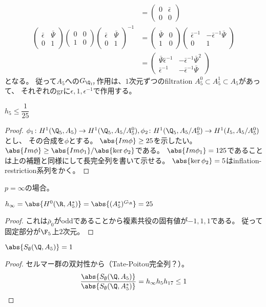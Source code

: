 \documentclass{jsarticle}
\begin{document}
\begin{align*}
&=\begin{pmatrix}0&\bar{\epsilon}\\0&0\end{pmatrix}\\
\begin{pmatrix}\bar{\epsilon}&\bar{\Psi}\\0&1\end{pmatrix}\begin{pmatrix}0&0\\1&0\end{pmatrix}\begin{pmatrix}\bar{\epsilon}&\bar{\Psi}\\0&1\end{pmatrix}^{-1}
&=\begin{pmatrix}\bar{\Psi}&0\\1&0\end{pmatrix}\begin{pmatrix}\bar{\epsilon}^{-1}&-\bar{\epsilon}^{-1}\bar{\Psi}\\0&1\end{pmatrix}\\
&=\begin{pmatrix}\bar{\Psi}\bar{\epsilon}^{-1}&-\bar{\epsilon}^{-1}\bar{\Psi}^2\\\bar{\epsilon}^{-1}&-\bar{\epsilon}^{-1}\bar{\Psi}\end{pmatrix}
\end{align*}
となる。
従って$A_5$への$G_{\Q_{17}}$作用は、$1$次元ずつのfiltration $A^0_5\subset A^1_5\subset A_5$があって、
それぞれのgrに$\epsilon, 1, \epsilon^{-1}$で作用する。
\begin{prop}
$h_{5}\leq\dfrac{1}{25}$
\end{prop}
\begin{proof}
$\phi_1\colon H^1(\Q_5,A_5)\to H^1(\Q_5,A_5/A_5^0), \phi_2\colon H^1(\Q_5,A_5/A_5^0)\to H^1(I_5,A_5/A_5^0)$とし、
その合成を$\phi$とする。
$\abs{Im\phi}\geq25$を示したい。
$\abs{Im\phi}\geq\abs{Im\phi_1}/\abs{\ker\phi_2}$である。
$\abs{Im\phi_1}=125$であることは上の補題と同様にして長完全列を書いて示せる。
$\abs{\ker\phi_2}=5$はinflation-restriction系列をかく。
\end{proof}

$p=\infty$の場合。
\begin{lem}
$h_\infty=\abs{H^0(\R,A_5^*)}=\abs{(A_5^*)^{G_\R}}=25$
\end{lem}
\begin{proof}
これは$\bar{\rho}_0$がoddであることから複素共役の固有値が$-1, 1, 1$である。
従って固定部分が$\F_5$上$2$次元。
\end{proof}
\begin{prop}
$\abs{S_\emptyset(\Q,A_5)}=1$
\end{prop}
\begin{proof}
セルマー群の双対性から（Tate-Poitou完全列？）。
\[
\frac{\abs{S_\emptyset(\Q,A_5)}}{\abs{S_\emptyset(\Q,A_5^*)}}=h_\infty h_5h_{17}\leq1
\]
\end{proof}
\end{document}
